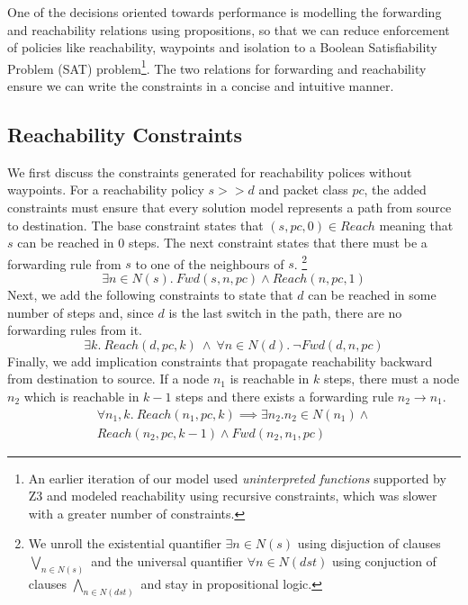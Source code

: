 One of the decisions oriented towards performance is modelling the forwarding and reachability relations using propositions, so that we can reduce enforcement of policies like reachability, waypoints and isolation to a Boolean Satisfiability Problem (SAT) problem\footnote{An earlier iteration of our model used \emph{uninterpreted functions} supported by Z3 and modeled reachability using recursive constraints, 
	which was slower with a greater number of constraints.}. 
The two relations for forwarding and reachability ensure we can write the constraints in a concise and intuitive manner.

\subsection{Reachability Constraints} \label{sec:reach}
We first discuss the constraints generated for reachability polices without waypoints.
For a reachability policy $s >> d$ and packet class $pc$, the added constraints must ensure that 
every solution model represents a path 
from source to destination. 
The base constraint states that $(s, pc,0) \in Reach$ meaning
that $s$ can be reached in $0$ steps. 
The next constraint states that there must be a forwarding rule from $s$ to one of
the neighbours of $s$.
\footnote{
	We unroll the existential quantifier $\exists n \in N(s)$ using disjuction of 
	clauses $\bigvee\limits_{n \in N(s)}$ and
	the universal quantifier $\forall n \in N(dst)$ using conjuction of clauses $\bigwedge\limits_{n \in N(dst)}$
	and stay in propositional logic.} 
\begin{equation} \label{eq:src}
	\exists n \in N(s).~Fwd(s, n, pc) \wedge Reach(n, pc, 1)
\end{equation}
Next, we add the following constraints to state that $d$ can be reached in some number of steps and,
since $d$ is the last switch in the path, there are no forwarding rules from it.
\begin{equation} \label{eq:dst}
	\exists k.~Reach(d, pc, k) \ \wedge \ \forall n \in N(d). \ \neg Fwd(d, n, pc)
\end{equation}
Finally, we add implication constraints that propagate reachability backward from destination to source. 
If a node $n_1$ is reachable in $k$ steps, there must a node $n_2$ which is reachable in  $k-1$ steps and there exists a forwarding rule $n_2 \rightarrow n_1$.
\begin{multline} \label{eq:bckprop}
\forall n_1,k.~ Reach(n_1,pc,k) \implies \exists n_2.  n_2 \in N(n_1) \wedge \\ Reach(n_2,pc,k-1) \wedge Fwd(n_2,n_1,pc)
\end{multline} 
